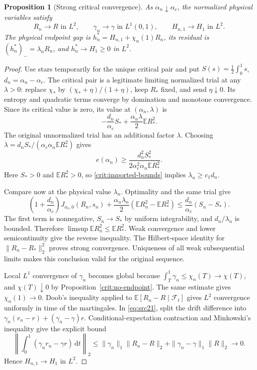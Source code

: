 \documentclass[11pt,a4paper]{article}
\numberwithin{equation}{section}
\newtheorem{proposition}[theorem]{Proposition}
\theoremstyle{definition}
\theoremstyle{remark}
\newcommand{\E}{\mathbb E}
\newcommand{\dd}{\mathrm d}
\begin{document}
\begin{proposition}[Strong critical convergence]\label{crit:strong}
As $\alpha_n\downarrow\alpha_c$, the normalized physical variables
satisfy
\[
 R_n\to R\text{ in }L^2,\qquad
 \gamma_n\to\gamma\text{ in }L^1(0,1),\qquad
 H_{n,1}\to H_1\text{ in }L^2.
\]
The physical endpoint gap is
$h_n^*=H_{n,1}+\chi_n(1)R_n$, its residual is
$(h_n^*)_-=\lambda_nR_n$, and $h_n^*\to H_1\ge0$ in $L^2$.
\end{proposition}

\begin{proof}
Use stars temporarily for the unique critical pair and put
$S(s)=\tfrac12\int_0^1s$, $d_n=\alpha_n-\alpha_c$.
The critical pair is a legitimate limiting normalized trial at any
$\lambda>0$: replace $\chi_*$ by
$(\chi_*+\eta)/(1+\eta)$, keep $R_*$ fixed, and send $\eta\downarrow0$.
Its entropy and quadratic terms converge by domination and monotone
convergence.  Since its critical value is zero, its value at
$(\alpha_n,\lambda)$ is
\[
 -\frac{d_n}{\alpha_c}S_*+
                 \frac{\alpha_n\lambda}{2}\E R_*^2.
\]
The original unnormalized trial has an additional factor $\lambda$.
Choosing
$\lambda=d_nS_*/(\alpha_c\alpha_n\E R_*^2)$ gives
\[
 e(\alpha_n)\ge
 \frac{d_n^2S_*^2}{2\alpha_c^2\alpha_n\E R_*^2}.
\]
Here $S_*>0$ and $\E R_*^2>0$, so
\eqref{crit:imported-bounds} implies $\lambda_n\ge c_1d_n$.

Compare now at the physical value $\lambda_n$.  Optimality and the
same trial give
\begin{equation}\label{crit:strong-inequality}
 \left(1+\frac{d_n}{\alpha_c}\right)
       J_{\alpha_c,0}(R_n,s_n)
 +\frac{\alpha_n\lambda_n}{2}
                   (\E R_n^2-\E R_*^2)
 \le\frac{d_n}{\alpha_c}(S_n-S_*).
\end{equation}
The first term is nonnegative, $S_n\to S_*$ by uniform integrability,
and $d_n/\lambda_n$ is bounded.  Therefore
$\limsup\E R_n^2\le\E R_*^2$.  Weak convergence and lower
semicontinuity give the reverse inequality.  The Hilbert-space identity
for $\|R_n-R_*\|_2^2$ proves strong convergence.
Uniqueness of all weak subsequential limits makes this conclusion
valid for the original sequence.

Local $L^1$ convergence of $\gamma_n$ becomes global because
$\int_T^1\gamma_n\le\chi_n(T)\to\chi(T)$, and
$\chi(T)\downarrow0$ by Proposition~\ref{crit:no-endpoint}.
The same estimate gives $\chi_n(1)\to0$.
Doob's inequality applied to $\E[R_n-R\mid\mathcal F_t]$ gives
$L^2$ convergence uniformly in time of the martingales.  In
\eqref{eq:src21}, split the drift difference into
$\gamma_n(r_n-r)+(\gamma_n-\gamma)r$.  Conditional-expectation
contraction and Minkowski's inequality give the explicit bound
\[
 \left\|\int_0^1(\gamma_nr_n-\gamma r)\,\dd t\right\|_2
 \le\|\gamma_n\|_1\|R_n-R\|_2
                      +\|\gamma_n-\gamma\|_1\|R\|_2\longrightarrow0.
\]
Hence $H_{n,1}\to H_1$ in $L^2$.


\end{proof}
\end{document}
